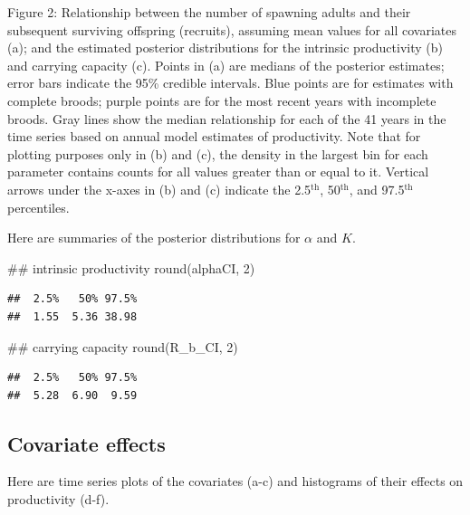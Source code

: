 \documentclass[
  11pt,
]{article}
\newenvironment{Shaded}{}{}
\newcommand{\CommentTok}[1]{\textcolor[rgb]{0.00,0.50,0.00}{#1}}
\newcommand{\DecValTok}[1]{#1}
\newcommand{\KeywordTok}[1]{\textcolor[rgb]{0.00,0.00,1.00}{#1}}
\newcommand{\NormalTok}[1]{#1}
\begin{document}
Figure 2: Relationship between the number of spawning adults and their
subsequent surviving offspring (recruits), assuming mean values for all
covariates (a); and the estimated posterior distributions for the
intrinsic productivity (b) and carrying capacity (c). Points in (a) are
medians of the posterior estimates; error bars indicate the 95\%
credible intervals. Blue points are for estimates with complete broods;
purple points are for the most recent years with incomplete broods. Gray
lines show the median relationship for each of the 41 years in the time
series based on annual model estimates of productivity. Note that for
plotting purposes only in (b) and (c), the density in the largest bin
for each parameter contains counts for all values greater than or equal
to it. Vertical arrows under the x-axes in (b) and (c) indicate the
2.5\(^\text{th}\), 50\(^\text{th}\), and 97.5\(^\text{th}\) percentiles.

Here are summaries of the posterior distributions for \(\alpha\) and
\(K\).

\begin{Shaded}
\begin{Highlighting}[]
\CommentTok{## intrinsic productivity}
\KeywordTok{round}\NormalTok{(alphaCI, }\DecValTok{2}\NormalTok{)}
\end{Highlighting}
\end{Shaded}

\begin{verbatim}
##  2.5%   50% 97.5% 
##  1.55  5.36 38.98
\end{verbatim}

\begin{Shaded}
\begin{Highlighting}[]
\CommentTok{## carrying capacity}
\KeywordTok{round}\NormalTok{(R_b_CI, }\DecValTok{2}\NormalTok{)}
\end{Highlighting}
\end{Shaded}

\begin{verbatim}
##  2.5%   50% 97.5% 
##  5.28  6.90  9.59
\end{verbatim}

\hypertarget{covariate-effects}{%
\subsection{Covariate effects}\label{covariate-effects}}

Here are time series plots of the covariates (a-c) and histograms of
their effects on productivity (d-f).
\end{document}
